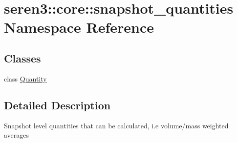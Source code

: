 \hypertarget{namespaceseren3_1_1core_1_1snapshot__quantities}{
\section{seren3::core::snapshot\_\-quantities Namespace Reference}
\label{namespaceseren3_1_1core_1_1snapshot__quantities}
}
\subsection*{Classes}
\begin{DoxyCompactItemize}
\item 
class \hyperlink{classseren3_1_1core_1_1snapshot__quantities_1_1Quantity}{Quantity}
\end{DoxyCompactItemize}


\subsection{Detailed Description}
\begin{DoxyVerb}
Snapshot level quantities that can be calculated, i.e volume/mass weighted averages
\end{DoxyVerb}
 